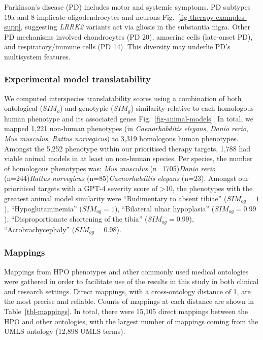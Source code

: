 \documentclass[
]{article}
\begin{document}
Parkinson's disease (PD) includes motor and systemic symptoms. PD
subtypes 19a and 8 implicate oligodendrocytes and neurons
Fig.~\ref{fig-therapy-examples-supp}, suggesting \emph{LRRK2} variants
act via gliosis in the substantia nigra. Other PD mechanisms involved
chondrocytes (PD 20), amacrine cells (late-onset PD), and
respiratory/immune cells (PD 14). This diversity may underlie PD's
multisystem features.

\subsubsection{Experimental model
translatability}\label{experimental-model-translatability}

We computed interspecies translatability scores using a combination of
both ontological (\(SIM_{o}\)) and genotypic (\(SIM_{g}\)) similarity
relative to each homologous human phenotype and its associated genes
Fig.~\ref{fig-animal-models}. In total, we mapped 1,221 non-human
phenotypes (in \emph{Caenorhabditis elegans}, \emph{Danio rerio},
\emph{Mus musculus}, \emph{Rattus norvegicus}) to 3,319 homologous human
phenotypes. Amongst the 5,252 phenotype within our prioritised therapy
targets, 1,788 had viable animal models in at least on non-human
species. Per species, the number of homologous phenotypes was: \emph{Mus
musculus} (n=1705)\emph{Danio rerio} (n=244)\emph{Rattus norvegicus}
(n=85)\emph{Caenorhabditis elegans} (n=23). Amongst our prioritised
targets with a GPT-4 severity score of \textgreater10, the phenotypes
with the greatest animal model similarity were ``Rudimentary to absent
tibiae'' (\(SIM_{og}=1\)), ``Hypoglutaminemia'' (\(SIM_{og}=1\)),
``Bilateral ulnar hypoplasia'' (\(SIM_{og}=0.99\)), ``Disproportionate
shortening of the tibia'' (\(SIM_{og}=0.99\)), ``Acrobrachycephaly''
(\(SIM_{og}=0.98\)).

\newpage{}

\subsubsection{Mappings}\label{mappings}

Mappings from HPO phenotypes and other commonly used medical ontologies
were gathered in order to facilitate use of the results in this study in
both clinical and research settings. Direct mappings, with a
cross-ontology distance of 1, are the most precise and reliable. Counts
of mappings at each distance are shown in Table~\ref{tbl-mappings}. In
total, there were 15,105 direct mappings between the HPO and other
ontologies, with the largest number of mappings coming from the UMLS
ontology (12,898 UMLS terms).
\end{document}

